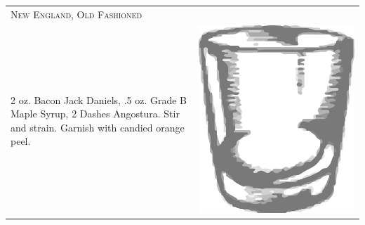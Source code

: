 \documentclass{article}
\begin{document}
\begin{tabular}{p{2in} p{0.5in}}
\multicolumn{2}{p{3in}}{\centering\Huge\textsc{New England, Old Fashioned}} \\ 
   \vspace{-0.1in}2 oz. Bacon Jack Daniels, .5 oz. Grade B Maple Syrup, 2 Dashes Angostura. Stir and strain. Garnish with candied orange peel. &
  \vspace{-0.1in} \includegraphics{rocks_glass.png}
\end{tabular}
\end{document}
